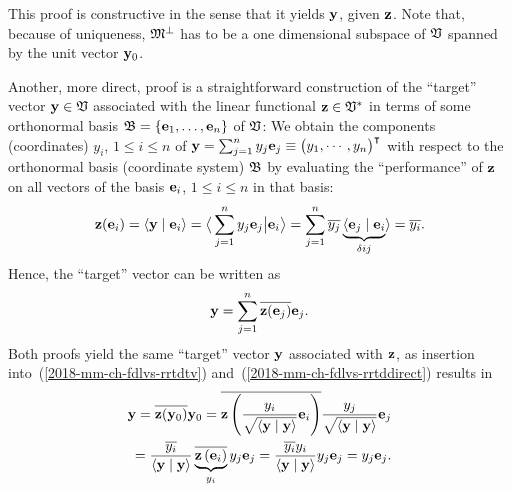 {This proof is constructive in the sense that it yields ${\bf y}$, given ${\bf z}$.
Note that, because of uniqueness,
${\frak M}^\perp$ has to be a one dimensional subspace of ${\frak V}$  spanned by the unit vector ${\bf y}_0$.

Another, more direct, proof
is a straightforward construction of the ``target'' vector
${\bf y} \in {\frak V}$
associated with the linear functional
${\bf z} \in {\frak V}^\ast$
in terms of some orthonormal basis
${\frak B} = \{ {\bf e}_1, \ldots , {\bf e}_n\}$
of ${\frak V}$:
We obtain the components (coordinates) $y_i$, $1\le i\le n$  of
${\bf y} =
\sum_{j=1}^n y_j{\bf e}_j
\equiv
\begin{pmatrix}
y_1,
\cdots ,
y_n
\end{pmatrix}^\intercal  $ with respect to the orthonormal basis (coordinate system) ${\frak B}$
by  evaluating the ``performance'' of
${\bf z} $
on all vectors of the basis ${\bf e}_i$, $1\le i\le n$ in that basis:
\begin{equation}
{\bf z}({\bf e}_i)
= \langle  {\bf y} \mid  {\bf e}_i \rangle
= \big\langle \sum_{j=1}^n y_j{\bf e}_j  \big\vert  {\bf e}_i \big\rangle
= \sum_{j=1}^n \overline{y_j}\underbrace{\langle {\bf e}_j  \mid  {\bf e}_i}_{\delta{ij}} \rangle
= \overline{y_i}
.
\label{2018-mm-ch-fdlvs-rrtddirect}
\end{equation}
Hence, the ``target'' vector can be written as
\begin{equation}
{\bf y}   =  \sum_{j=1}^n  \overline{{\bf z}({\bf e}_j)}  {\bf e}_j
.
\label{2018-mm-ch-fdlvs-rrtddirect2}
\end{equation}
Both proofs yield the same ``target'' vector ${\bf y}$ associated with ${\bf z}$, as   insertion into~(\ref{2018-mm-ch-fdlvs-rrtdtv}) and~(\ref{2018-mm-ch-fdlvs-rrtddirect}) results in
\begin{equation}
\begin{split}
{\bf y}
=  \overline{{\bf z}({\bf y}_0)} {\bf y}_0
=  \overline{{\bf z}\left( \frac{y_i}{\sqrt{\langle{\bf y}\mid{\bf y}\rangle}}{\bf e}_i \right)}  \frac{y_j}{\sqrt{\langle{\bf y}\mid{\bf y}\rangle}}{\bf e}_j  \\
=  \frac{\overline{y_i}}{ \langle{\bf y}\mid{\bf y}\rangle }\underbrace{\overline{{\bf z}\left( {\bf e}_i \right)}}_{y_i}   y_j {\bf e}_j
=  \frac{\overline{y_i}y_i}{\langle{\bf y}\mid{\bf y}\rangle }   y_j{\bf e}_j  = y_j{\bf e}_j
.
\end{split}
\label{2018-mm-ch-fdlvs-rrtddirect21}
\end{equation}


\eproof
}



